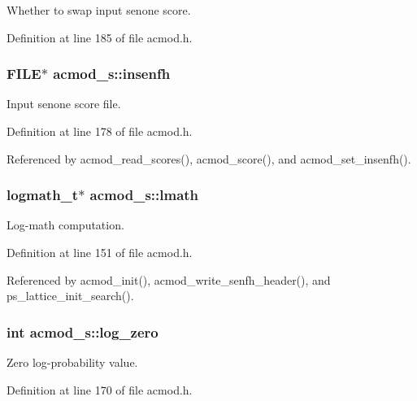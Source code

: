 Whether to swap input senone score. 



Definition at line 185 of file acmod.\-h.

\subsubsection[{insenfh}]{\setlength{\rightskip}{0pt plus 5cm}F\-I\-L\-E$\ast$ acmod\-\_\-s\-::insenfh}\label{structacmod__s_ad0998a9d887db82bd684e9454c9b044e}


Input senone score file. 



Definition at line 178 of file acmod.\-h.



Referenced by acmod\-\_\-read\-\_\-scores(), acmod\-\_\-score(), and acmod\-\_\-set\-\_\-insenfh().

\subsubsection[{lmath}]{\setlength{\rightskip}{0pt plus 5cm}logmath\-\_\-t$\ast$ acmod\-\_\-s\-::lmath}\label{structacmod__s_a9de7e8ac9c0c4df3d2a9ad5406787f3c}


Log-\/math computation. 



Definition at line 151 of file acmod.\-h.



Referenced by acmod\-\_\-init(), acmod\-\_\-write\-\_\-senfh\-\_\-header(), and ps\-\_\-lattice\-\_\-init\-\_\-search().

\subsubsection[{log\-\_\-zero}]{\setlength{\rightskip}{0pt plus 5cm}int acmod\-\_\-s\-::log\-\_\-zero}\label{structacmod__s_a95d5195647b6395d95433d45e3f74d51}


Zero log-\/probability value. 



Definition at line 170 of file acmod.\-h.



